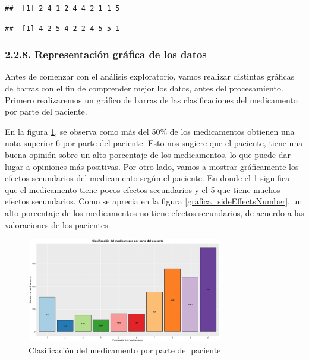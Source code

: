 \documentclass[spanish,]{article}
\newenvironment{Shaded}{\begin{snugshade}}{\end{snugshade}}
\newcommand{\KeywordTok}[1]{\textcolor[rgb]{0.13,0.29,0.53}{\textbf{#1}}}
\newcommand{\DecValTok}[1]{\textcolor[rgb]{0.00,0.00,0.81}{#1}}
\newcommand{\OperatorTok}[1]{\textcolor[rgb]{0.81,0.36,0.00}{\textbf{#1}}}
\newcommand{\NormalTok}[1]{#1}
\begin{document}
\begin{Shaded}
\end{Shaded}

\begin{verbatim}
##  [1] 2 4 1 2 4 4 2 1 1 5
\end{verbatim}

\begin{Shaded}
\end{Shaded}

\begin{verbatim}
##  [1] 4 2 5 4 2 2 4 5 5 1
\end{verbatim}

\subsubsection{2.2.8. Representación gráfica de los
datos}\label{representacion-grafica-de-los-datos}

Antes de comenzar con el análisis exploratorio, vamos realizar distintas
gráficas de barras con el fin de comprender mejor los datos, antes del
procesamiento. Primero realizaremos un gráfico de barras de las
clasificaciones del medicamento por parte del paciente.

En la figura \ref{grafica_rating}, se observa como más del 50\% de los
medicamentos obtienen una nota superior 6 por parte del paciente. Esto
nos sugiere que el paciente, tiene una buena opinión sobre un alto
porcentaje de los medicamentos, lo que puede dar lugar a opiniones más
positivas. Por otro lado, vamos a mostrar gráficamente los efectos
secundarios del medicamento según el paciente. En donde el 1 significa
que el medicamento tiene pocos efectos secundarios y el 5 que tiene
muchos efectos secundarios. Como se aprecia en la figura
\ref{grafica_sideEffectsNumber}, un alto porcentaje de los medicamentos
no tiene efectos secundarios, de acuerdo a las valoraciones de los
pacientes.

\begin{figure}[ht]
    \centering
    \includegraphics[width=0.76\textwidth]{imagenes/grafica_rating.png}
    \caption{Clasificación del medicamento por parte del paciente}
    \label{grafica_rating}
\end{figure}
\end{document}
